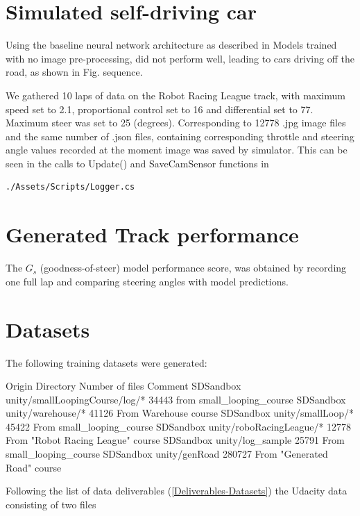 
\section{Simulated self-driving car}

Using the baseline neural network architecture as described in 
Models trained with no image pre-processing, did not perform well, leading to cars driving off the road, as shown in Fig.  sequence.

We gathered 10 laps of data on the Robot Racing League track, with maximum speed set to 2.1, proportional control set to 16 and differential set to 77. Maximum steer was set to 25 (degrees). Corresponding to 12778 .jpg image files and the same number of  .json files, containing corresponding throttle and steering angle values recorded at the moment image was saved by simulator. This can be seen in the calls to Update() and SaveCamSensor functions in  
\begin{verbatim}
./Assets/Scripts/Logger.cs
\end{verbatim}

\section{Generated Track performance}


The $G_s$ (goodness-of-steer) model performance score, was obtained by recording one full lap and comparing steering angles with model predictions.

\section{Datasets}

The following training datasets were generated:

Origin  Directory   Number of files Comment
SDSandbox   unity/smallLoopingCourse/log/* 34443 from small\_looping\_course
SDSandbox   unity/warehouse/*   41126 From Warehouse course
SDSandbox   unity/smallLoop/*   45422   From small\_looping\_course
SDSandbox   unity/roboRacingLeague/* 12778 From "Robot Racing League" course
SDSandbox   unity/log\_sample   25791   From small\_looping\_course
SDSandbox   unity/genRoad 280727 From "Generated Road" course



Following the list of data deliverables (\ref{Deliverables-Datasets}) the Udacity data consisting of two files 

